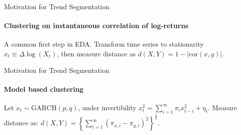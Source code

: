 \documentclass{beamer}
\begin{document}

\begin{frame}{Motivation for Trend Segmentation}
\framesubtitle{Clustering on instantaneous correlation of log-returns}

A common first step in EDA. Transform time series to stationarity $x_t \equiv \Delta \log \left ( X_t \right )$, then measure distance as $d(X,Y) = 1-\left | \text{cor} \left ( x,y \right ) \right |$.

\begin{figure}
    \centering
    \begin{subfigure}
        \texttt{[image: ../plots/SnP500\_cor\_similar.png]}
    \end{subfigure}
        \begin{subfigure}
        \texttt{[image: ../plots/SnP500\_random\_selection.png]}
    \end{subfigure}
        \begin{subfigure}
        \texttt{[image: ../plots/SnP500\_cor\_dissimilar.png]}
    \end{subfigure}
\end{figure}
    
\end{frame}




\begin{frame}{Motivation for Trend Segmentation}
\framesubtitle{Model based clustering}


Let $x_t \sim \text{GARCH}(p,q)$, under invertibility
$x_t^2 = \sum_{i=1}^\infty \pi_{i} x_{t-i}^2 + \eta_{t}$. Measure distance as: $ d\left ( X, Y \right ) = \left \{ \sum_{i=1}^\infty \left ( \pi_{x,i} - \pi_{y,i} \right )^2 \right \}^{\frac{1}{2}}$. 

\bigskip

\begin{figure}
    \centering
    \begin{subfigure}
        \texttt{[image: ../plots/SnP500\_garch\_dissimilar\_1.png]}
    \end{subfigure}
    \begin{subfigure}
        \texttt{[image: ../plots/SnP500\_garch\_dissimilar\_2.png]}
    \end{subfigure}\
\end{figure}

\end{frame}
\end{document}
